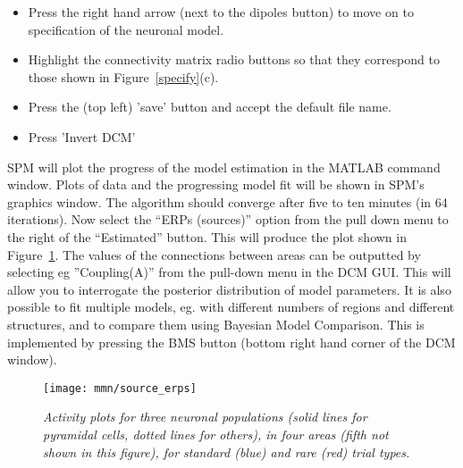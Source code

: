 \begin{itemize}
\item{Press the right hand arrow (next to the dipoles button) to move on to specification of the neuronal model.}
\item{Highlight the connectivity matrix radio buttons so that they  correspond to those shown in Figure~\ref{specify}(c).}
\item{Press the (top left) 'save' button and accept the default file name.}
\item{Press 'Invert DCM'}
\end{itemize}
SPM will plot the progress of the model estimation in the MATLAB command window. Plots of data and the progressing model fit will be shown in SPM's graphics window. The algorithm should converge after five to ten minutes (in 64 iterations). Now select the ``ERPs (sources)'' option from the pull down menu to the right of the ``Estimated'' button. This will produce the plot shown in Figure~\ref{source_erps}. The values of the connections between areas can be outputted by selecting eg ''Coupling(A)'' from the pull-down menu in the DCM GUI. This will allow you to interrogate the posterior distribution of model parameters. It is also possible to fit multiple models, eg. with different numbers of regions and different structures, and to compare them using Bayesian Model Comparison. This is implemented by pressing the BMS button (bottom right hand corner of the DCM window).

\begin{figure}
\begin{center}
\texttt{[image: mmn/source\_erps]}
\caption{\em Activity plots for three neuronal populations (solid lines for pyramidal cells, dotted lines for others), in four areas (fifth not shown in this figure), for standard (blue) and rare (red) trial types.
\label{source_erps} }
\end{center}
\end{figure}
